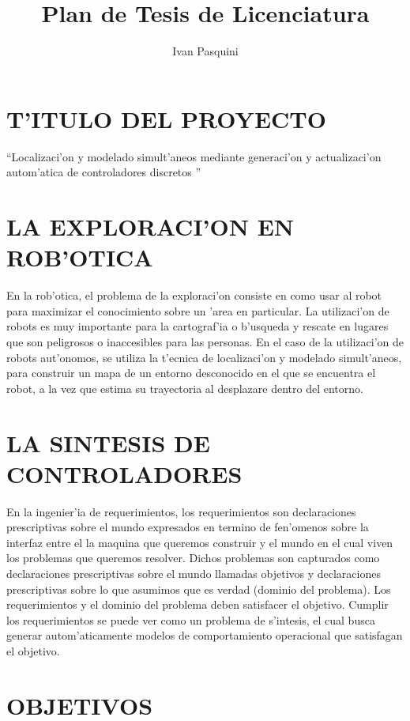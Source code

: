 \documentclass{article}
\title{Plan de Tesis de Licenciatura}
\author{Ivan Pasquini}
\begin{document}
\maketitle

\section{T'ITULO DEL PROYECTO}
``Localizaci'on y modelado simult'aneos mediante generaci'on y actualizaci'on autom'atica de controladores discretos ''

\section{LA EXPLORACI'ON EN ROB'OTICA}
En la rob'otica, el problema de la exploraci'on consiste en como usar al robot para maximizar el conocimiento sobre un 'area en particular. La utilizaci'on de robots es muy importante para la cartograf'ia o b'usqueda y rescate en lugares que son peligrosos o inaccesibles para las personas. En el caso de la utilizaci'on de robots aut'onomos, se utiliza la t'ecnica de localizaci'on y modelado simult'aneos, para construir un mapa de un entorno desconocido en el que se encuentra el robot, a la vez que estima su trayectoria al desplazare dentro del entorno.

\section{LA SINTESIS DE CONTROLADORES}
En la ingenier'ia de requerimientos, los requerimientos son declaraciones prescriptivas sobre el mundo expresados en termino de fen'omenos sobre la interfaz entre el la maquina que queremos construir y el mundo en el cual viven los problemas que queremos resolver. Dichos problemas son capturados como declaraciones prescriptivas sobre el mundo llamadas objetivos y declaraciones prescriptivas sobre lo que asumimos que es verdad (dominio del problema).
Los requerimientos y el dominio del problema deben satisfacer el objetivo. Cumplir los requerimientos se puede ver como un problema de s'intesis, el cual busca generar autom'aticamente modelos de comportamiento operacional que satisfagan el objetivo.

\section{OBJETIVOS}
\end{document}
